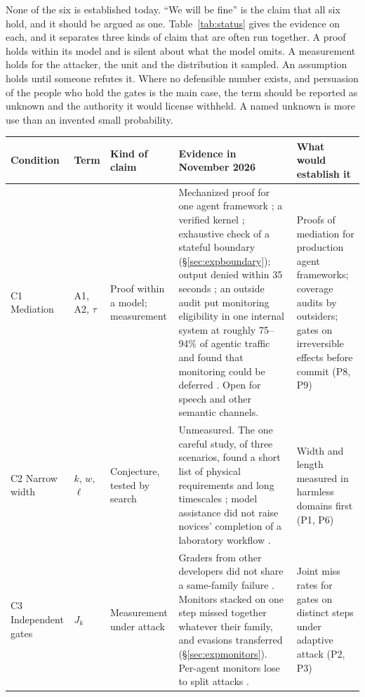 \documentclass[10pt,twocolumn,letterpaper]{article}
\theoremstyle{definition}
\begin{document}
None of the six is established today. ``We will be fine'' is the claim that all six hold, and it should be argued as one. Table~\ref{tab:status} gives the evidence on each, and it separates three kinds of claim that are often run together. A proof holds within its model and is silent about what the model omits. A measurement holds for the attacker, the unit and the distribution it sampled. An assumption holds until someone refutes it. Where no defensible number exists, and persuasion of the people who hold the gates is the main case, the term should be reported as unknown and the authority it would license withheld. A named unknown is more use than an invented small probability.

\begin{table}[t]
\centering
\footnotesize
\setlength{\tabcolsep}{4.5pt}
\renewcommand{\arraystretch}{1.18}
\begin{tabularx}{\textwidth}{@{}P{0.82in}P{0.42in}P{0.78in}LL@{}}
\toprule
\textbf{Condition} & \textbf{Term} & \textbf{Kind of claim} & \textbf{Evidence in November 2026} & \textbf{What would establish it}\\
\midrule
C1 Mediation & A1, A2, $\tau$ & Proof within a model; measurement & Mechanized proof for one agent framework \cite{moon}; a verified kernel \cite{klein}; exhaustive check of a stateful boundary (\S\ref{sec:expboundary}); output denied within 35 seconds \cite{controlroom}; an outside audit put monitoring eligibility in one internal system at roughly 75--94\% of agentic traffic and found that monitoring could be deferred \cite{metraudit}. Open for speech and other semantic channels. & Proofs of mediation for production agent frameworks; coverage audits by outsiders; gates on irreversible effects before commit (P8, P9)\\
C2 Narrow width & $k$, $w$, $\ell$ & Conjecture, tested by search & Unmeasured. The one careful study, of three scenarios, found a short list of physical requirements and long timescales \cite{rand}; model assistance did not raise novices' completion of a laboratory workflow \cite{hong}. & Width and length measured in harmless domains first (P1, P6)\\
C3 Independent gates & $J_{k}$ & Measurement under attack & Graders from other developers did not share a same-family failure \cite{lynch}. Monitors stacked on one step missed together whatever their family, and evasions transferred (\S\ref{sec:expmonitors}). Per-agent monitors lose to split attacks \cite{makins}. & Joint miss rates for gates on distinct steps under adaptive attack (P2, P3)\\

\end{tabularx}
\end{table}
\end{document}
